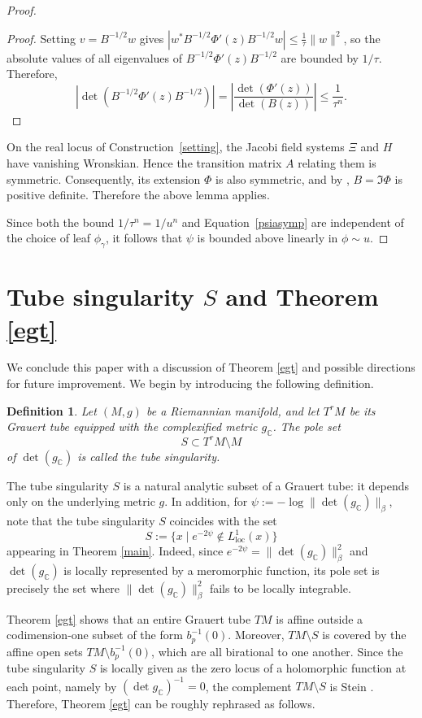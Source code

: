 \documentclass[a4paper, 12pt]{article}
\newcommand{\loc}{\mathrm{loc}}
\newcommand{\gC}{g_{\mathbb{C}}}
\newtheorem{defn}[thm]{Definition}
\begin{document}
\begin{proof}
\begin{proof}
Setting $v = B^{-1/2} w$ gives
$|w^* B^{-1/2} \Phi'(z) B^{-1/2} w| \le \frac{1}{\tau} \|w\|^2$,
so the absolute values of all eigenvalues of $B^{-1/2} \Phi'(z) B^{-1/2}$ are bounded by $1/\tau$. 
Therefore,
\[
\left|\det (B^{-1/2} \Phi'(z) B^{-1/2})\right |=\left|\frac{\det(\Phi'(z))}{\det(B(z))}\right| \le \frac{1}{\tau^n}.
\]
\end{proof}
On the real locus of Construction~\ref{setting}, the Jacobi field systems $\Xi$ and $H$ have vanishing Wronskian. Hence the transition matrix $A$ relating them is symmetric. Consequently, its extension $\Phi$ is also symmetric, and by \cite[Lemma~6.7]{LS91}, $B=\Im \Phi$ is positive definite. Therefore the above lemma applies. 

Since both the bound $1/\tau^n = 1/u^n$ and Equation~\ref{psiasymp} are independent of the choice of leaf $\phi_\gamma$, it follows that $\psi$ is bounded above linearly in $\phi\sim u$.
\end{proof}

\section{Tube singularity $S$ and Theorem \ref{egt}}\label{egtdisc}

We conclude this paper with a discussion of Theorem \ref{egt} and possible directions for future improvement. We begin by introducing the following definition.

\begin{defn}\label{ts}
Let $(M,g)$ be a Riemannian manifold, and let $T^rM$ be its Grauert tube equipped with the complexified metric $\gC$. The pole set
\[
S \subset T^rM \setminus M
\]
of $\det(\gC)$ is called the \emph{tube singularity}.
\end{defn}

The tube singularity $S$ is a natural analytic subset of a Grauert tube: it depends only on the underlying metric $g$. In addition, for $\psi := -\log \|\det(\gC)\|_{\beta}$, note that the tube singularity $S$ coincides with the set
\[
S := \{x \mid e^{-2\psi} \notin L^1_\loc(x)\}
\]
appearing in Theorem \ref{main}. Indeed, since $e^{-2\psi} = \|\det(\gC)\|_{\beta}^2$ and $\det(\gC)$ is locally represented by a meromorphic function, its pole set is precisely the set where $\|\det(\gC)\|_{\beta}^2$ fails to be locally integrable.

Theorem \ref{egt} shows that an entire Grauert tube $TM$ is affine outside a codimension-one subset of the form $b_p^{-1}(0)$. Moreover, $TM\setminus S$ is covered by the affine open sets $TM\setminus b_p^{-1}(0)$, which are all birational to one another. Since the tube singularity $S$ is locally given as the zero locus of a holomorphic function at each point, namely by $(\det \gC)^{-1} = 0$, the complement $TM \setminus S$ is Stein \cite[Corollary 4]{Z21}. Therefore, Theorem \ref{egt} can be roughly rephrased as follows.
\end{document}
